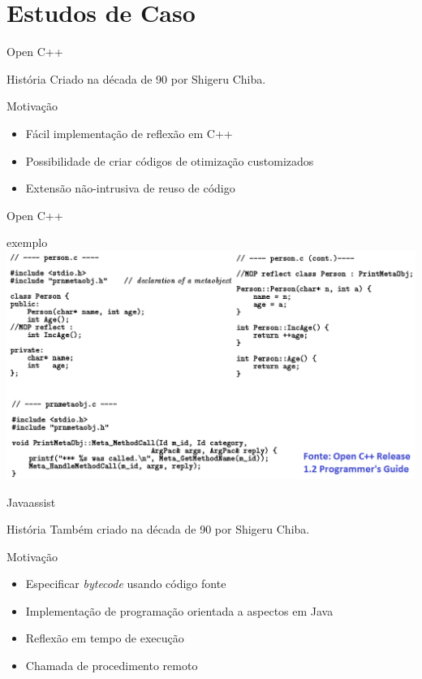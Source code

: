 \documentclass[12pt,t]{beamer}
\begin{document}
 	\section{Estudos de Caso}
	 \begin{frame}{Open C++}
	 	\begin{block}{História}
			Criado na década de 90 por Shigeru Chiba.
 	 	\end{block}
	 	\begin{block}{Motivação}
			\begin{itemize}
 	 			\item Fácil implementação de reflexão em C++
 	 			\item Possibilidade de criar códigos de otimização customizados
				\item Extensão não-intrusiva de reuso de código
 	 		\end{itemize}
 	 	\end{block}
	 \end{frame}
	 \begin{frame}{Open C++}
 	 	\begin{block}{exemplo}
 	 		\includegraphics[width=1\textwidth]{example_open_cxx}
 	 	\end{block}
	 \end{frame}
	 \begin{frame}{Javaassist}
	 	\begin{block}{História}
			Também criado na década de 90 por Shigeru Chiba.
 	 	\end{block}
	 	\begin{block}{Motivação}
			\begin{itemize}
 	 			\item Especificar \emph{bytecode} usando código fonte
 	 			\item Implementação de programação orientada a aspectos em Java
 	 			\item Reflexão em tempo de execução
				\item Chamada de procedimento remoto
 	 		\end{itemize}
 	 	\end{block}
	 \end{frame}
\end{document}
